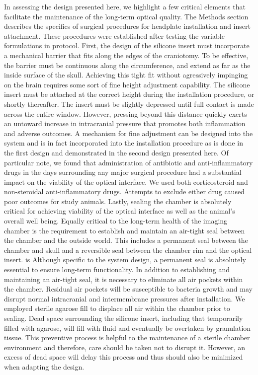 In assessing the design presented here, we highlight a few critical elements that facilitate the maintenance of the long-term optical quality. The Methods section describes the specifics of surgical procedures for headplate installation and insert attachment. These procedures were established after testing the variable formulations in protocol.
First, the design of the silicone insert must incorporate a mechanical barrier that fits along the edges of the craniotomy. To be effective, the barrier must be continuous along the circumference, and extend as far as the inside surface of the skull.
Achieving this tight fit without agressively impinging on the brain requires some sort of fine height adjustment capability. The silicone insert must be attached at the correct height during the installation procedure, or shortly thereafter. The insert must be slightly depressed until full contact is made across the entire window. However, pressing beyond this distance quickly exerts an untoward increase in intracranial pressure that promotes both inflammation and adverse outcomes. A mechanism for fine adjustment can be designed into the system and is in fact incorporated into the installation procedure as is done in the first design and demonstrated in the second design presented here.
Of particular note, we found that administration of antibiotic and anti-inflammatory drugs in the days surrounding any major surgical procedure had a substantial impact on the viability of the optical interface. We used both corticosteroid and non-steroidal anti-inflammatory drugs. Attempts to exclude either drug caused poor outcomes for study animals.
Lastly, sealing the chamber is absolutely critical for achieving viability of the optical interface as well as the animal’s overall well being. Equally critical to the long-term health of the imaging chamber is the requirement to establish and maintain an air-tight seal between the chamber and the outside world. This includes a permanent seal between the chamber and skull and a reversible seal between the chamber rim and the optical insert. is Although specific to the system design, a permanent seal is absolutely essential to ensure long-term functionality.
In addition to establishing and maintaining an air-tight seal, it is necessary to eliminate all air pockets within the chamber. Residual air pockets will be susceptible to bacteria growth and may disrupt normal intracranial and intermembrane pressures after installation. We employed sterile agarose fill to displace all air within the chamber prior to sealing. Dead space surrounding the silicone insert, including that temporarily filled with agarose, will fill with fluid and eventually be overtaken by granulation tissue. This preventive process is helpful to the maintenance of a sterile chamber environment and therefore, care should be taken not to disrupt it. However, an excess of dead space will delay this process and thus should also be minimized when adapting the design.
